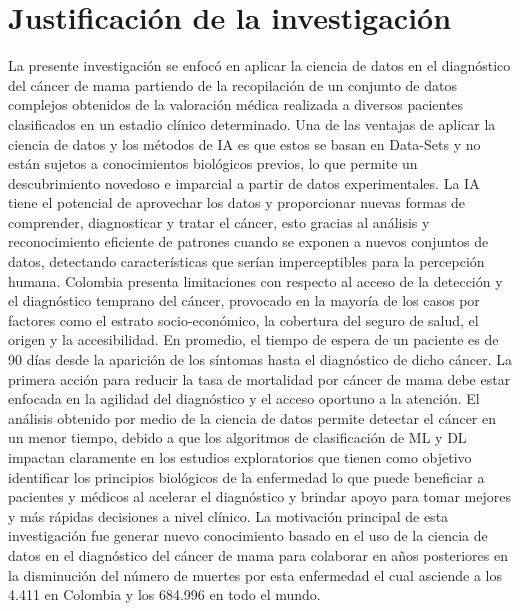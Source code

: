 \section{Justificación de la investigación}
La presente investigación se enfocó en aplicar la ciencia de datos en el diagnóstico del cáncer de mama partiendo de la recopilación de un conjunto de datos complejos obtenidos de la valoración médica realizada a diversos pacientes clasificados en un estadio clínico determinado. Una de las ventajas de aplicar la ciencia de datos y los métodos de IA es que estos se basan en Data-Sets y no están sujetos a conocimientos biológicos previos, lo que permite un descubrimiento novedoso e imparcial a partir de datos experimentales\cite{Troyanskaya2020}. La IA tiene el potencial de aprovechar los datos y proporcionar nuevas formas de comprender, diagnosticar y tratar el cáncer, esto gracias al análisis y reconocimiento eficiente de patrones cuando se exponen a nuevos conjuntos de datos, detectando características que serían imperceptibles para la percepción humana\cite{Turin2020}. 
Colombia presenta limitaciones con respecto al acceso de la detección y el diagnóstico temprano del cáncer, provocado en la mayoría de los casos por factores como el estrato socio-económico, la cobertura del seguro de salud, el origen y la accesibilidad. En promedio, el tiempo de espera de un paciente es de 90 días desde la aparición de los síntomas hasta el diagnóstico de dicho cáncer. La primera acción para reducir la tasa de mortalidad por cáncer de mama debe estar enfocada en la agilidad del diagnóstico y el acceso oportuno a la atención\cite{Duarte2021}. El análisis obtenido por medio de la ciencia de datos permite detectar el cáncer en un menor tiempo, debido a que los algoritmos de clasificación de ML y DL impactan claramente en los estudios exploratorios que tienen como objetivo identificar los principios biológicos de la enfermedad lo que puede beneficiar a pacientes y médicos al acelerar el diagnóstico y brindar apoyo para tomar mejores y más rápidas decisiones a nivel clínico\cite{Turin2020}. 
La motivación principal de esta investigación fue generar nuevo conocimiento basado en el uso de la ciencia de datos en el diagnóstico del cáncer de mama para colaborar en años posteriores en la disminución del número de muertes por esta enfermedad el cual asciende a los 4.411 en Colombia\cite{InternationalAgencyforResearchonCancer2020} y los 684.996 en todo el mundo\cite{InternationalAgencyGlobal2020}.

\newpage
